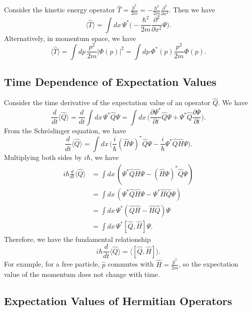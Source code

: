 \begin{framedexpl}
    Consider the kinetic energy operator $\hat{T}=\frac{\hat{p}^2}{2m}=-\frac{\hbar^2}{2m}\frac{\partial^2}{\partial x^2}$. Then we have $$\langle\hat{T}\rangle= \int dx\,\Psi^*\bigg(-\frac{\hbar^2}{2m}\frac{\partial^2}{\partial x^2}\Psi\bigg).$$Alternatively, in momentum space, we have $$\langle\hat{T}\rangle=\int dp\,\frac{p^2}{2m}|\Phi(p)|^2=\int dp\,\Phi^*(p)\frac{p^2}{2m}\Phi(p).$$
\end{framedexpl}

\subsection{Time Dependence of Expectation Values}\label{time_dependence_expectation}

Consider the time derivative of the expectation value of an operator $\hat{Q}$. We have $$\frac{d}{dt}\langle\hat{Q}\rangle=\frac{d}{dt}\int dx\,\Psi^*\hat{Q}\Psi=\int dx\,\bigg(\frac{\partial\Psi^*}{\partial t}\hat{Q}\Psi+\Psi^*\hat{Q}\frac{\partial\Psi}{\partial t}\bigg).$$From the Schrödinger equation, we have $$\frac{d}{dt}\langle\hat{Q}\rangle=\int dx\,\bigg(\frac{i}{\hbar}(\hat{H}\Psi)^*\hat{Q}\Psi-\frac{i}{\hbar}\Psi^*\hat{Q}\hat{H}\Psi\bigg).$$Multiplying both sides by $i\hbar$, we have \begin{align*}i\hbar\frac{d}{dt}\langle\hat{Q}\rangle&=\int dx\,(\Psi^*\hat{Q}\hat{H}\Psi-(\hat{H}\Psi)^*\hat{Q}\Psi)\\&=\int dx\,(\Psi^*\hat{Q}\hat{H}\Psi-\Psi^*\hat{H}\hat{Q}\Psi)\\&=\int dx\,\Psi^*(\hat{Q}\hat{H}-\hat{H}\hat{Q})\Psi\\&=\int dx\,\Psi^*[\hat{Q},\hat{H}]\Psi.\end{align*}Therefore, we have the fundamental relationship $$i\hbar\frac{d}{dt}\langle\hat{Q}\rangle=\langle[\hat{Q},\hat{H}]\rangle.$$For example, for a free particle, $\hat{p}$ commutes with $\hat{H}=\frac{\hat{p}^2}{2m}$, so the expectation value of the momentum does not change with time.

\subsection{Expectation Values of Hermitian Operators}\label{expected_hermitian}

